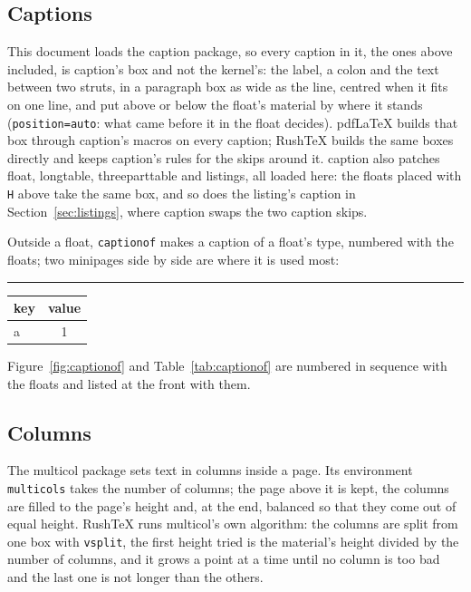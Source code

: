 \documentclass{article}
\numberwithin{equation}{section}
\theoremstyle{definition}
\theoremstyle{remark}
\begin{document}
\subsection{Captions}\label{sec:captions}
This document loads the caption package, so every caption in it, the ones above included,
is caption's box and not the kernel's: the label, a colon and the text between two struts,
in a paragraph box as wide as the line, centred when it fits on one line, and put above or
below the float's material by where it stands (\texttt{position=auto}: what came before
it in the float decides). pdfLaTeX builds that box through caption's macros on every
caption; RushTeX builds the same boxes directly and keeps caption's rules for the skips
around it. caption also patches float, longtable, threeparttable and listings, all loaded
here: the floats placed with \texttt{H} above take the same box, and so does the listing's
caption in Section~\ref{sec:listings}, where caption swaps the two caption skips.

Outside a float, \texttt{captionof} makes a caption of a float's type, numbered with the
floats; two minipages side by side are where it is used most:
\begin{center}
\begin{minipage}{.45\linewidth}
  \centering
  \rule{3cm}{1.5cm}
  \label{fig:captionof}
\end{minipage}\hfill
\begin{minipage}{.45\linewidth}
  \centering
  \label{tab:captionof}
  \begin{tabular}{lc}
    key & value \\ \hline
    a & 1
  \end{tabular}
\end{minipage}
\end{center}
Figure~\ref{fig:captionof} and Table~\ref{tab:captionof} are numbered in sequence with the
floats and listed at the front with them.

\subsection{Columns}\label{sec:columns}

The multicol package sets text in columns inside a page. Its environment
\texttt{multicols} takes the number of columns; the page above it is kept, the columns
are filled to the page's height and, at the end, balanced so that they come out of equal
height. RushTeX runs multicol's own algorithm: the columns are split from one box with
\texttt{vsplit}, the first height tried is the material's height divided by the number of
columns, and it grows a point at a time until no column is too bad and the last one is not
longer than the others.
\end{document}
